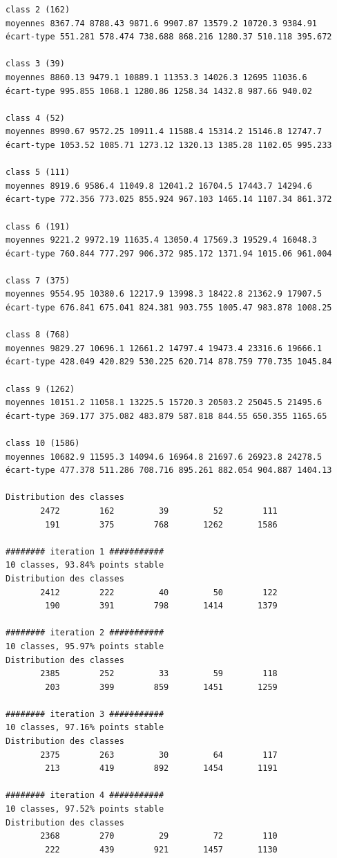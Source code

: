 \documentclass[earth,article,submit,pdftex,moreauthors]{Definitions/mdpi}
\begin{document}
\begin{scriptsize}
\begin{verbatim}
class 2 (162)
moyennes 8367.74 8788.43 9871.6 9907.87 13579.2 10720.3 9384.91
écart-type 551.281 578.474 738.688 868.216 1280.37 510.118 395.672

class 3 (39)
moyennes 8860.13 9479.1 10889.1 11353.3 14026.3 12695 11036.6
écart-type 995.855 1068.1 1280.86 1258.34 1432.8 987.66 940.02

class 4 (52)
moyennes 8990.67 9572.25 10911.4 11588.4 15314.2 15146.8 12747.7
écart-type 1053.52 1085.71 1273.12 1320.13 1385.28 1102.05 995.233

class 5 (111)
moyennes 8919.6 9586.4 11049.8 12041.2 16704.5 17443.7 14294.6
écart-type 772.356 773.025 855.924 967.103 1465.14 1107.34 861.372

class 6 (191)
moyennes 9221.2 9972.19 11635.4 13050.4 17569.3 19529.4 16048.3
écart-type 760.844 777.297 906.372 985.172 1371.94 1015.06 961.004

class 7 (375)
moyennes 9554.95 10380.6 12217.9 13998.3 18422.8 21362.9 17907.5
écart-type 676.841 675.041 824.381 903.755 1005.47 983.878 1008.25

class 8 (768)
moyennes 9829.27 10696.1 12661.2 14797.4 19473.4 23316.6 19666.1
écart-type 428.049 420.829 530.225 620.714 878.759 770.735 1045.84

class 9 (1262)
moyennes 10151.2 11058.1 13225.5 15720.3 20503.2 25045.5 21495.6
écart-type 369.177 375.082 483.879 587.818 844.55 650.355 1165.65

class 10 (1586)
moyennes 10682.9 11595.3 14094.6 16964.8 21697.6 26923.8 24278.5
écart-type 477.378 511.286 708.716 895.261 882.054 904.887 1404.13

Distribution des classes
       2472        162         39         52        111
        191        375        768       1262       1586

######## iteration 1 ###########
10 classes, 93.84% points stable
Distribution des classes
       2412        222         40         50        122
        190        391        798       1414       1379

######## iteration 2 ###########
10 classes, 95.97% points stable
Distribution des classes
       2385        252         33         59        118
        203        399        859       1451       1259

######## iteration 3 ###########
10 classes, 97.16% points stable
Distribution des classes
       2375        263         30         64        117
        213        419        892       1454       1191

######## iteration 4 ###########
10 classes, 97.52% points stable
Distribution des classes
       2368        270         29         72        110
        222        439        921       1457       1130


\end{verbatim}
\end{scriptsize}
\end{document}
